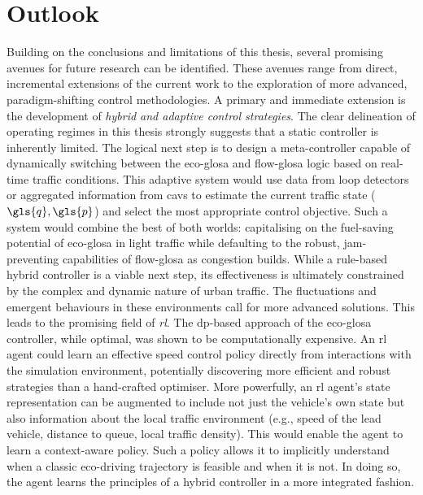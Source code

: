 \section{Outlook}
\label{sec:Outlook}

Building on the conclusions and limitations of this thesis, several promising avenues for future research can be identified. These avenues range from direct, incremental extensions of the current work to the exploration of more advanced, paradigm-shifting control methodologies.
\mynewline
A primary and immediate extension is the development of \textit{hybrid and adaptive control strategies}. The clear delineation of operating regimes in this thesis strongly suggests that a static controller is inherently limited. The logical next step is to design a meta-controller capable of dynamically switching between the \ac{eco-glosa} and \ac{flow-glosa} logic based on real-time traffic conditions. This adaptive system would use data from loop detectors or aggregated information from \acp{cav} to estimate the current traffic state ($\gls{q}, \gls{p}$) and select the most appropriate control objective. Such a system would combine the best of both worlds: capitalising on the fuel-saving potential of \ac{eco-glosa} in light traffic while defaulting to the robust, jam-preventing capabilities of \ac{flow-glosa} as congestion builds.
\mynewline
While a rule-based hybrid controller is a viable next step, its effectiveness is ultimately constrained by the complex and dynamic nature of urban traffic. The fluctuations and emergent behaviours in these environments call for more advanced solutions. This leads to the promising field of \textit{\acf{rl}}. The \ac{dp}-based approach of the \ac{eco-glosa} controller, while optimal, was shown to be computationally expensive. An \ac{rl} agent could learn an effective speed control policy directly from interactions with the simulation environment, potentially discovering more efficient and robust strategies than a hand-crafted optimiser. More powerfully, an \ac{rl} agent's state representation can be augmented to include not just the vehicle's own state but also information about the local traffic environment (e.g., speed of the lead vehicle, distance to queue, local traffic density). This would enable the agent to learn a context-aware policy. Such a policy allows it to implicitly understand when a classic eco-driving trajectory is feasible and when it is not. In doing so, the agent learns the principles of a hybrid controller in a more integrated fashion.
\mynewline
